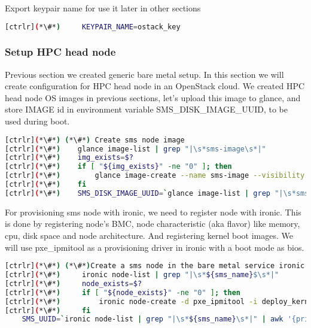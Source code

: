 Export keypair name for use it later in other sections

\begin{lstlisting}[language=bash,keywords={}]
[ctrlr](*\#*)     KEYPAIR_NAME=ostack_key
\end{lstlisting}

\subsubsection{Setup HPC head node}


Previous section we created generic bare metal setup. In this section we will create configuration for HPC head node in an OpenStack cloud.
We created HPC head node OS images in previous sections, let's upload this image to glance, and store IMAGE id in environment variable SMS\_DISK\_IMAGE\_UUID, to be used during boot. 

\begin{lstlisting}[language=bash,keywords={}]
[ctrlr](*\#*) (*\#*) Create sms node image
[ctrlr](*\#*)    glance image-list | grep "|\s*sms-image\s*|"
[ctrlr](*\#*)    img_exists=$?
[ctrlr](*\#*)    if [ "${img_exists}" -ne "0" ]; then
[ctrlr](*\#*)        glance image-create --name sms-image --visibility public --disk-format qcow2 --container-format bare < ${chpc_image_sms}
[ctrlr](*\#*)    fi
[ctrlr](*\#*)    SMS_DISK_IMAGE_UUID=`glance image-list | grep "|\s*sms-image\s*|" | awk '{print $2}'`
\end{lstlisting}

For provisioning sms node with ironic, we need to register node with ironic. This is done by registering node's BMC, node characteristic (aka flavor) like memory, cpu, disk space and node architecture. And registering kernel boot images. We will use pxe\_ipmitool as a provisioning driver in ironic with a boot mode as bios.

\begin{lstlisting}[language=bash,keywords={}]
[ctrlr](*\#*) (*\#*)Create a sms node in the bare metal service ironic.
[ctrlr](*\#*)     ironic node-list | grep "|\s*${sms_name}$\s*|"
[ctrlr](*\#*)     node_exists=$?
[ctrlr](*\#*)     if [ "${node_exists}" -ne "0" ]; then 
[ctrlr](*\#*)         ironic node-create -d pxe_ipmitool -i deploy_kernel=${DEPLOY_VMLINUZ_UUID} -i deploy_ramdisk=${DEPLOY_INITRD_UUID} -i ipmi_terminal_port=8023 -i ipmi_address=${sms_bmc} -i ipmi_username=${sms_bmc_username} -i ipmi_password=${sms_bmc_password} -p cpus=${CPU} -p memory_mb=${RAM_MB} -p local_gb=${DISK_GB} -p cpu_arch=${ARCH} -p capabilities="boot_mode:bios" -n ${sms_name}
[ctrlr](*\#*)     fi
    SMS_UUID=`ironic node-list | grep "|\s*${sms_name}\s*|" | awk '{print $2}'`
\end{lstlisting}

